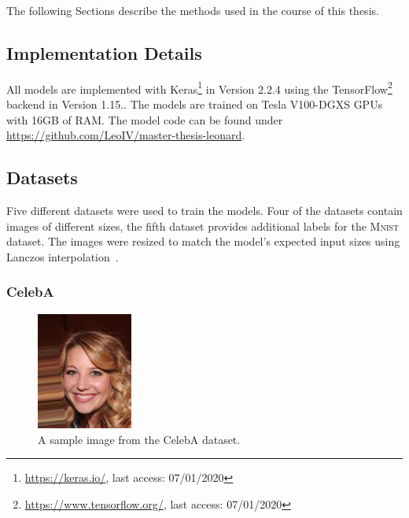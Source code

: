 The following Sections describe the methods used in the course of this thesis.

\subsection{Implementation Details}\label{subsec:implementation-details}

All models are implemented with Keras\footnote{\href{https://keras.io/}{https://keras.io/}, last access: 07/01/2020} in Version 2.2.4 using the TensorFlow\footnote{\href{https://www.tensorflow.org/}{https://www.tensorflow.org/}, last access: 07/01/2020} backend in Version 1.15..
The models are trained on Tesla V100-DGXS GPUs with 16GB of RAM.
The model code can be found under \href{https://github.com/LeoIV/master-thesis-leonard}{https://github.com/LeoIV/master-thesis-leonard}.

\subsection{Datasets}\label{subsec:datasets}

Five different datasets were used to train the models.
Four of the datasets contain images of different sizes, the fifth dataset provides additional labels for the \textsc{Mnist} dataset.
The images were resized to match the model's expected input sizes using Lanczos interpolation~\citep[pp. 223, ff]{burger2009principles}.

\subsubsection{CelebA}\label{subsubsec:celeba_dataset}

\begin{figure}
    \begin{center}
        \includegraphics[width=0.28\textwidth]{images/celeba_sample_63.jpg}
    \end{center}
    \caption[CelebA dataset sample image]{A sample image from the CelebA dataset.}
    \label{fig:celeba_sample}
\end{figure}

